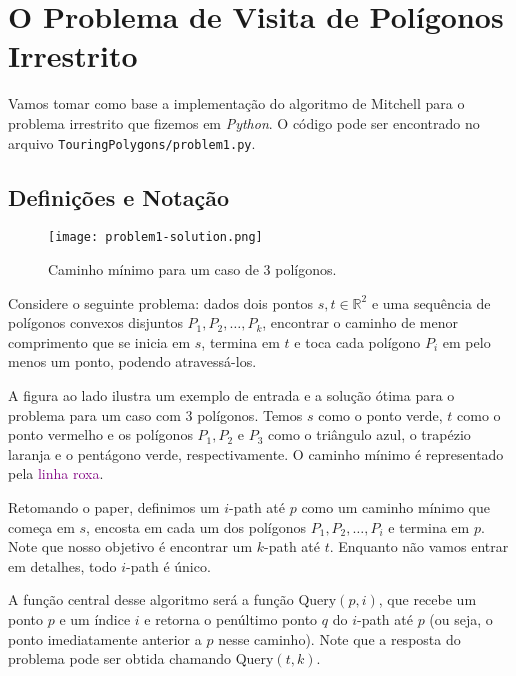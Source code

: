 \documentclass{article}
\begin{document}
\section{O Problema de Visita de Polígonos Irrestrito}

Vamos tomar como base a implementação do algoritmo de Mitchell para o problema irrestrito que fizemos em \textit{Python}. O código pode ser encontrado no arquivo \texttt{TouringPolygons/problem1.py}.

\subsection{Definições e Notação}

\begin{wrapfigure}{r}{0.40\textwidth}
    \centering
	\vspace{-10pt}
    \texttt{[image: problem1-solution.png]}
    \caption{Caminho mínimo para um caso de 3 polígonos.}
\end{wrapfigure}

Considere o seguinte problema: dados dois pontos \(s, t \in \mathbb{R}^2\) e uma sequência de polígonos convexos disjuntos \(P_1, P_2, \ldots, P_k\), encontrar o caminho de menor comprimento que se inicia em \(s\), termina em \(t\) e toca cada polígono \(P_i\) em pelo menos um ponto, podendo atravessá-los.

A figura ao lado ilustra um exemplo de entrada e a solução ótima para o problema para um caso com 3 polígonos. Temos \(s\) como o \textcolor[RGB]{0,128,0}{ponto verde}, \(t\) como o \textcolor[RGB]{255, 0, 0}{ponto vermelho} e os polígonos \(P_1, P_2\) e \(P_3\) como o \textcolor[RGB]{76, 146, 195}{triângulo azul}, o trapézio laranja e o pentágono verde, respectivamente. O caminho mínimo é representado pela \textcolor{purple}{linha roxa}.

Retomando o paper, definimos um \(i\)-path até \(p\) como um caminho mínimo que começa em \(s\), encosta em cada um dos polígonos \(P_1, P_2, \ldots, P_i\) e termina em \(p\). Note que nosso objetivo é encontrar um \(k\)-path até \(t\). Enquanto não vamos entrar em detalhes, todo \(i\)-path é único.

A função central desse algoritmo será a função \(\text{Query}(p, i)\), que recebe um ponto \(p\) e um índice \(i\) e retorna o penúltimo ponto \(q\) do \(i\)-path até \(p\) (ou seja, o ponto imediatamente anterior a \(p\) nesse caminho). Note que a resposta do problema pode ser obtida chamando \(\text{Query}(t, k)\).
\end{document}
